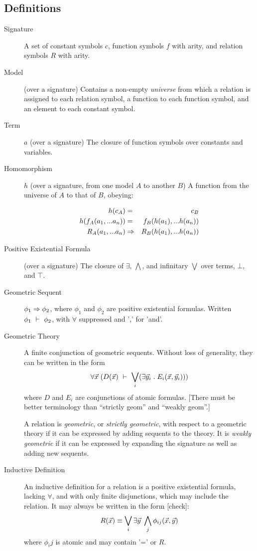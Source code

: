 \documentclass{article}
\begin{document}
\subsection{Definitions}
\begin{description}

\item[Signature] A set of constant symbols $c$, function symbols $f$
with arity, and relation symbols $R$ with arity.

\item[Model] (over a signature) Contains a non-empty \emph{universe}
from which a relation is assigned to each relation symbol, a function
to each function symbol, and an element to each constant symbol.

\item[Term] $a$ (over a signature) The closure of function symbols over
constants and variables.

\item[Homomorphism] $h$ (over a signature, from one model $A$ to another
$B$) A function from the universe of $A$ to that of $B$, obeying:

\begin{eqnarray*}
h(c_A) &=& c_B \\
h(f_A(a_1, ... a_n)) &=& f_B(h(a_1), ... h(a_n)) \\
R_A(a_1, ... a_n) &\Rightarrow& R_B(h(a_1), ... h(a_n))
\end{eqnarray*}

\item[Positive Existential Formula] (over a signature) The closure of
$\exists$, $\bigwedge$, and infinitary $\bigvee$ over terms, $\bot$,
and $\top$.

\item[Geometric Sequent] $\phi_1 \Rightarrow \phi_2$, where $\phi_1$ and
$\phi_2$ are positive existential formulas.  Written
$\phi_1 \ \vdash\ \phi_2$, with $\forall$ suppressed and ',' for 'and'.

\item[Geometric Theory] A finite conjunction of geometric sequents. Without
loss of generality, they can be written in the form
$$ \forall \vec{x}\; (D(\vec{x}) \ \vdash\ \bigvee_i(\exists \vec{y}_i\; .\; E_i(\vec{x}, \vec{y}_i))) $$
where $D$ and $E_i$ are conjunctions of atomic formulas. [There must
be better terminology than ``strictly geom'' and ``weakly geom''.]

A relation is \emph{geometric}, or \emph{strictly geometric}, with
respect to a geometric theory if it can be expressed by adding
sequents to the theory.  It is \emph{weakly geometric} if it can be
expressed by expanding the signature as well as adding new sequents.

\item[Inductive Definition] An inductive definition for a relation is
a positive existential formula, lacking $\forall$, and with only
finite disjunctions, which may include the relation. It may always be
written in the form [check]:
$$ R(\vec{x}) \equiv \bigvee_i \exists
\vec{y}\; \bigwedge_j \phi_{ij}(\vec{x}, \vec{y}) $$
where $\phi_ij$ is atomic and may contain '=' or $R$.

\end{description}
\end{document}
